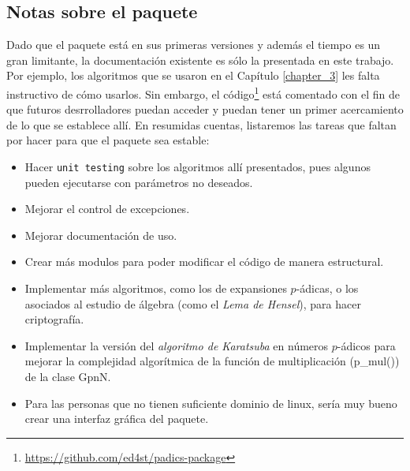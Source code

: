 \subsection*{Notas sobre el paquete}
Dado que el paquete está en sus primeras versiones y además el tiempo es un gran limitante, la documentación existente es sólo la presentada en este trabajo. Por ejemplo, los algoritmos que se usaron en el Capítulo \ref{chapter_3} les falta instructivo de cómo usarlos. Sin embargo, el código\footnote{\url{https://github.com/ed4st/padics-package}} está comentado con el fin de que futuros desrrolladores puedan acceder y puedan tener un primer acercamiento de lo que se establece allí. En resumidas cuentas, listaremos las tareas que faltan por hacer para que el paquete sea estable:
\begin{itemize}
	\item Hacer \texttt{unit testing} sobre los algoritmos allí presentados, pues algunos pueden ejecutarse con parámetros no deseados.
	\item Mejorar el control de excepciones.
	\item Mejorar documentación de uso.
	\item Crear más modulos para poder modificar el código de manera estructural.
	\item Implementar más algoritmos, como los de expansiones $p$-ádicas, o los asociados al estudio de álgebra (como el \textit{Lema de Hensel}), para hacer criptografía.
	\item Implementar la versión del \textit{algoritmo de Karatsuba} en números $p$-ádicos para mejorar la complejidad algorítmica de la función de multiplicación (p\_mul()) de la clase GpnN.
	\item Para las personas que no tienen suficiente dominio de linux, sería muy bueno crear una interfaz gráfica del paquete.
	
\end{itemize}


\iffalse




La construcción de un modelo de movimiento aleatorio sobre $\mathbb{Q}^n_p$ análogo al movimiento Browniano hace uso de la maquinaria clásica de procesos de Markov sobre espacios métricos, ver por ejemplo \cite{Dyn}.

Definamos
\[ p\left(  t,x,y\right)  =Z\left(  x-y,t\right),\, \, t>0,  \] 
y
\[
P(t,x,B)=%
\begin{cases}
\int_{B}p(t,y,x)d^{n}y &  t>0,\quad x\in\mathbb{Q}_{p}^{n}\\
\boldsymbol{1}_{B}(x) &  t=0, 
\end{cases}
\]
donde $B$ es un subconjunto de Borel de $\mathbb{Q}_{p}^{n}$.
$P(t,x,B)$ representa la probabilidad de que una partícula salte al conjunto $B$, después de $t$ segundos, siendo que estaba en la posición $x$. De manera más técnica, podemos decir que  $Z\left(  x,t\right)  $ es la función de densidad de transición de un proceso
estocástico de Markov $X(t,\omega)$, el  cual es homogéneo en el espacio y en el tiempo, y cuyas trayectorias $X_{\omega}(t)$, curvas en $\mathbb{Q}_{p}^{n}$, son continuas por derecha con   discontinuidades  solamente de  salto, ver \cite[Teorema 5.3]{Ch-Z}.
\fi

